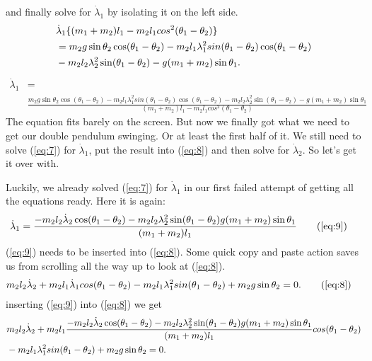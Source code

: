 \documentclass[paper=a4, fontsize=11pt]{scrartcl} %
\numberwithin{equation}{section} %
\numberwithin{figure}{section} %
\numberwithin{table}{section} %
\begin{document}
and finally solve for $\dot{\lambda}_1$ by isolating it on the left side.
\begin{align} 
  &\dot{\lambda}_1 \{(m_1 + m_2) l_1 - m_2 l_1 cos^2(\theta_1 - \theta_2)\} \notag \\
  &= m_2 g \sin \theta_2 \cos(\theta_1 - \theta_2) - m_2 l_1 \lambda^2_1 sin(\theta_1 - \theta_2)\cos(\theta_1 - \theta_2) \notag \\
  &- m_2 l_2 \lambda^2_2 \sin(\theta_1 - \theta_2) - g (m_1 + m_2) \sin \theta_1. \label{eq:16}
\end{align}
\begin{align} 
  \dot{\lambda}_1 &= \\ \label{eq:17}
  &\frac{m_2 g \sin \theta_2 \cos(\theta_1 - \theta_2) - m_2 l_1 \lambda^2_1 sin(\theta_1 - \theta_2)\cos(\theta_1 - \theta_2) - m_2 l_2 \lambda^2_2 \sin(\theta_1 - \theta_2) - g (m_1 + m_2) \sin \theta_1}{(m_1 + m_2) l_1 - m_2 l_1 cos^2(\theta_1 - \theta_2)}  
\end{align}
The equation fits barely on the screen. But now we finally got what we need to get our double pendulum swinging. Or at least the first half of it. We still need to 
solve (\ref{eq:7}) for $\dot{\lambda}_1$, put the result into (\ref{eq:8}) and then solve for $\dot{\lambda}_2$. So let's get it over with.
\vspace{\baselineskip}

Luckily, we already solved (\ref{eq:7}) for $\dot{\lambda}_1$ in our first failed attempt of getting all the equations ready. Here it is again:
\begin{align} 
  \dot{\lambda}_1 &= \frac{- m_2 l_2 \dot{\lambda}_2 \cos(\theta_1 - \theta_2) - m_2 l_2 \lambda^2_2 \sin(\theta_1 - \theta_2) g (m_1 + m_2) \sin \theta_1}{(m_1 + m_2) l_1} \tag{\ref{eq:9}}
\end{align}
(\ref{eq:9}) needs to be inserted into (\ref{eq:8}). Some quick copy and paste action saves us from scrolling all the way up to look at (\ref{eq:8}).
\begin{align} 
  m_2 l_2 \dot{\lambda}_2 + m_2 l_1 \dot{\lambda}_1 cos(\theta_1 - \theta_2)
  - m_2 l_1 \lambda^2_1 sin(\theta_1 - \theta_2) + m_2 g \sin \theta_2 &= 0. \tag{\ref{eq:8}}
\end{align}
inserting (\ref{eq:9}) into (\ref{eq:8}) we get
\begin{align} 
  &m_2 l_2 \dot{\lambda}_2 + m_2 l_1 \frac{- m_2 l_2 \dot{\lambda}_2 \cos(\theta_1 - \theta_2) - m_2 l_2 \lambda^2_2 \sin(\theta_1 - \theta_2) g (m_1 + m_2) \sin \theta_1}{(m_1 + m_2) l_1} cos(\theta_1 - \theta_2) \\ \notag
  &- m_2 l_1 \lambda^2_1 sin(\theta_1 - \theta_2) + m_2 g \sin \theta_2 = 0. \label{eq:18}
\end{align}
\end{document}
